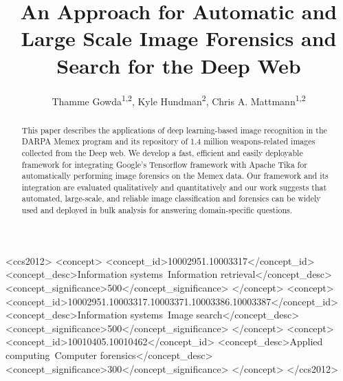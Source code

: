 \documentclass[sigconf]{acmart}
\begin{document}
\title[Automatic Large Scale Image Forensics]{An Approach for Automatic and Large Scale Image Forensics and Search for the Deep Web}
\author{Thamme Gowda\textsuperscript{1,2}, Kyle Hundman\textsuperscript{2}, Chris A. Mattmann\textsuperscript{1,2}}

\renewcommand{\shortauthors}{T. Gowda, K. Hundman, C. Mattmann}




\begin{abstract}
This paper describes the applications of deep learning-based image recognition in the DARPA Memex program and its repository of 1.4 million weapons-related images collected from the Deep web. We develop a fast, efficient and easily deployable framework for integrating Google's Tensorflow framework with Apache Tika for automatically performing image forensics on the Memex data. Our framework and its integration are evaluated qualitatively and quantitatively and our work suggests that automated, large-scale, and reliable image classification and forensics can be widely used and deployed in bulk analysis for answering domain-specific questions.
\end{abstract}

%
%
\begin{CCSXML}
<ccs2012>
<concept>
<concept_id>10002951.10003317</concept_id>
<concept_desc>Information systems~Information retrieval</concept_desc>
<concept_significance>500</concept_significance>
</concept>
<concept>
<concept_id>10002951.10003317.10003371.10003386.10003387</concept_id>
<concept_desc>Information systems~Image search</concept_desc>
<concept_significance>500</concept_significance>
</concept>
<concept>
<concept_id>10010405.10010462</concept_id>
<concept_desc>Applied computing~Computer forensics</concept_desc>
<concept_significance>300</concept_significance>
</concept>
</ccs2012>
\end{CCSXML}
\end{document}
